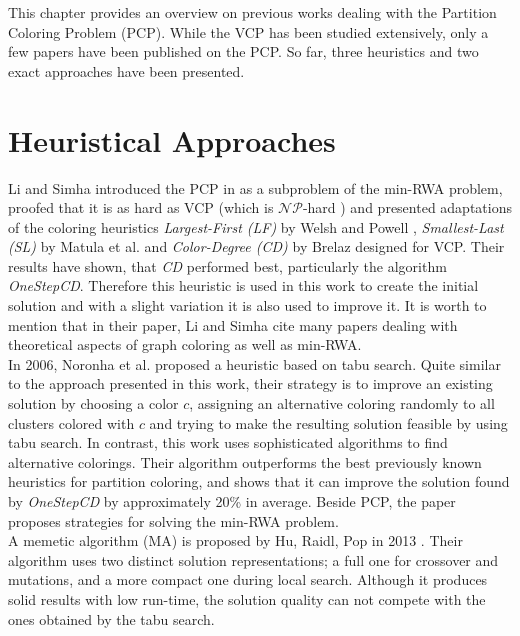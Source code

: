 This chapter provides an overview on previous works dealing with the Partition Coloring Problem (PCP). While the VCP has been studied extensively, only a few papers have been published on the PCP. So far, three heuristics and two exact approaches have been presented.

\section{Heuristical Approaches}
Li and Simha introduced the PCP in \cite{li-00} as a subproblem of the min-RWA problem, proofed that it is as hard as VCP (which is $\mathcal{NP}$-hard \cite{karp-72}) and presented adaptations of the coloring heuristics \textit{Largest-First (LF)} by Welsh and Powell \cite{welsh-67}, \textit{Smallest-Last (SL)} by Matula et al. \cite{matula-72} and \textit{Color-Degree (CD)} by Brelaz \cite{brelaz-79} designed for VCP. Their results have shown, that \textit{CD} performed best, particularly the algorithm \textit{OneStepCD}. Therefore this heuristic is used in this work to create the initial solution and with a slight variation it is also used to improve it. It is worth to mention that in their paper, Li and Simha cite many papers dealing with theoretical aspects of graph coloring as well as min-RWA.\\
In 2006, Noronha et al. \cite{noronha-06} proposed a heuristic based on tabu search. Quite similar to the approach presented in this work, their strategy is to improve an existing solution by choosing a color $c$, assigning an alternative coloring randomly to all clusters colored with $c$ and trying to make the resulting solution feasible by using tabu search. In contrast, this work uses sophisticated algorithms to find alternative colorings. Their algorithm outperforms the best previously known heuristics for partition coloring, and shows that it can improve the solution found by \textit{OneStepCD} by approximately 20\% in average. Beside PCP, the paper proposes  strategies for solving the min-RWA problem.\\
A memetic algorithm (MA) is proposed by Hu, Raidl, Pop in 2013 \cite{pop-12}. Their algorithm uses two distinct solution representations; a full one for crossover and mutations, and a more compact one during local search. Although it produces solid results with low run-time, the solution quality can not compete with the ones obtained by the tabu search.


